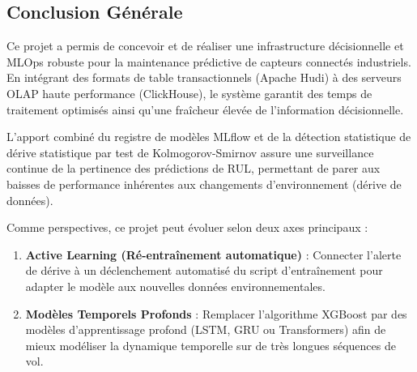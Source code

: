 \documentclass[12pt]{report}
\begin{document}
\begin{center}
\chapter*{Conclusion Générale}
\end{center}

Ce projet a permis de concevoir et de réaliser une infrastructure décisionnelle et MLOps robuste pour la maintenance prédictive de capteurs connectés industriels. En intégrant des formats de table transactionnels (Apache Hudi) à des serveurs OLAP haute performance (ClickHouse), le système garantit des temps de traitement optimisés ainsi qu'une fraîcheur élevée de l'information décisionnelle.

L'apport combiné du registre de modèles MLflow et de la détection statistique de dérive statistique par test de Kolmogorov-Smirnov assure une surveillance continue de la pertinence des prédictions de RUL, permettant de parer aux baisses de performance inhérentes aux changements d'environnement (dérive de données).

Comme perspectives, ce projet peut évoluer selon deux axes principaux :
\begin{enumerate}
    \item \textbf{Active Learning (Ré-entraînement automatique)} : Connecter l'alerte de dérive à un déclenchement automatisé du script d'entraînement pour adapter le modèle aux nouvelles données environnementales.
    \item \textbf{Modèles Temporels Profonds} : Remplacer l'algorithme XGBoost par des modèles d'apprentissage profond (LSTM, GRU ou Transformers) afin de mieux modéliser la dynamique temporelle sur de très longues séquences de vol.
\end{enumerate}
\end{document}

